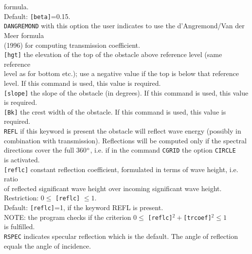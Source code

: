 \documentclass[12pt]{book}
\begin{document}
\begin{tabbing}
                    formula.\\
                    Default: {\tt [beta]}=0.15.\-\\
{\tt DANGREMOND} \> with this option the user indicates to use the d'Angremond/Van der Meer formula\+\\
                    (1996) for computing transmission coefficient.\-\\
{\tt [hgt]}      \> the elevation of the top of the obstacle above reference level (same reference\+\\
                    level as for bottom etc.); use a negative value if the top is below that reference\\
                    level. If this command is used, this value is required.\-\\
{\tt [slope]}    \> the slope of the obstacle (in degrees). If this command is used, this value is required.\\
{\tt [Bk]}       \> the crest width of the obstacle. If this command is used, this value is required.\\
{\tt REFL}       \> if this keyword is present the obstacle will reflect wave energy (possibly in\+\\
                    combination with transmission). Reflections will be computed only if the spectral\\
                    directions cover the full 360$^{\rm o}$, i.e. if in the command {\tt CGRID} the option {\tt CIRCLE}\\
                    is activated.\-\\
{\tt [reflc]}    \> constant reflection coefficient, formulated in terms of wave height, i.e. ratio\+\\
                    of reflected significant wave height over incoming significant wave height.\\
                    Restriction: $0 \leq$ {\tt [reflc]} $\leq 1$.\\
                    Default: {\tt [reflc]}=1, if the keyword REFL is present.\\
                    NOTE: the program checks if the criterion $0 \leq$ {\tt [reflc]}$^2 + ${\tt [trcoef]}$^2 \leq 1$\\
                    is fulfilled.\-\\
{\tt RSPEC}      \> indicates specular reflection which is the default. The angle of reflection\+\\
                    equals the angle of incidence.\-\\

\end{tabbing}
\end{document}
